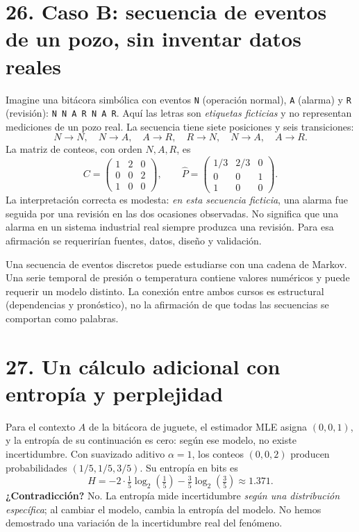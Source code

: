 \section*{26. Caso B: secuencia de eventos de un pozo, sin inventar datos reales}
Imagine una bitácora simbólica con eventos \texttt{N} (operación normal), \texttt{A} (alarma) y \texttt{R} (revisión): \texttt{N N A R N A R}. Aquí las letras son \emph{etiquetas ficticias} y no representan mediciones de un pozo real. La secuencia tiene siete posiciones y seis transiciones:
\[
N\to N,\quad N\to A,\quad A\to R,\quad R\to N,\quad N\to A,\quad A\to R.
\]
La matriz de conteos, con orden $N,A,R$, es
\[
C=\begin{pmatrix}1&2&0\\0&0&2\\1&0&0\end{pmatrix},\qquad
\widehat P=\begin{pmatrix}1/3&2/3&0\\0&0&1\\1&0&0\end{pmatrix}.
\]
La interpretación correcta es modesta: \emph{en esta secuencia ficticia}, una alarma fue seguida por una revisión en las dos ocasiones observadas. No significa que una alarma en un sistema industrial real siempre produzca una revisión. Para esa afirmación se requerirían fuentes, datos, diseño y validación.

\begin{idea}
Una secuencia de eventos discretos puede estudiarse con una cadena de Markov. Una serie temporal de presión o temperatura contiene valores numéricos y puede requerir un modelo distinto. La conexión entre ambos cursos es estructural (dependencias y pronóstico), no la afirmación de que todas las secuencias se comportan como palabras.
\end{idea}

\section*{27. Un cálculo adicional con entropía y perplejidad}
Para el contexto $A$ de la bitácora de juguete, el estimador MLE asigna $(0,0,1)$, y la entropía de su continuación es cero: según ese modelo, no existe incertidumbre. Con suavizado aditivo $\alpha=1$, los conteos $(0,0,2)$ producen probabilidades $(1/5,1/5,3/5)$. Su entropía en bits es
\[
H=-2\cdot\tfrac15\log_2(\tfrac15)-\tfrac35\log_2(\tfrac35)\approx1.371.
\]
\textbf{¿Contradicción?} No. La entropía mide incertidumbre \emph{según una distribución específica}; al cambiar el modelo, cambia la entropía del modelo. No hemos demostrado una variación de la incertidumbre real del fenómeno.

